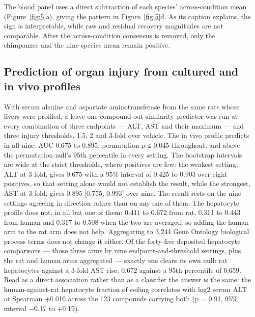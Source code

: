 \documentclass[11pt,a4paper]{article}
\begin{document}
The blood panel uses a direct subtraction of each species'
across-condition mean (Figure~\ref{fig:5}a), giving the pattern in Figure~\ref{fig:5}d. As
its caption explains, the sign is interpretable, while raw and residual
recovery magnitudes are not comparable. After the across-condition
consensus is removed, only the chimpanzee and the nine-species mean
remain positive.

\subsection{Prediction of organ injury from cultured and in vivo
profiles}\label{prediction-of-organ-injury-from-cultured-and-in-vivo-profiles}

With serum alanine and aspartate aminotransferase from the same rats
whose livers were profiled, a leave-one-compound-out similarity
predictor was run at every combination of three endpoints --- ALT, AST
and their maximum --- and three injury thresholds, 1.5, 2 and 3-fold
over vehicle. The in vivo profile predicts in all nine: AUC 0.675 to
0.895, permutation p ≤ 0.045 throughout, and above the permutation
null's 95th percentile in every setting. The bootstrap intervals are
wide at the strict thresholds, where positives are few: the weakest
setting, ALT at 3-fold, gives 0.675 with a 95\% interval of 0.425 to
0.903 over eight positives, so that setting alone would not establish
the result, while the strongest, AST at 3-fold, gives 0.895 {[}0.755,
0.993{]} over nine. The result rests on the nine settings agreeing in
direction rather than on any one of them. The hepatocyte profile does
not, in all but one of them: 0.411 to 0.672 from rat, 0.311 to 0.443
from human and 0.317 to 0.508 when the two are averaged, so adding the
human arm to the rat arm does not help. Aggregating to 3,244 Gene
Ontology biological process terms does not change it either. Of the
forty-five deposited hepatocyte comparisons --- those three arms by nine
endpoint-and-threshold settings, plus the rat and human arms aggregated
--- exactly one clears its own null: rat hepatocytes against a 3-fold
AST rise, 0.672 against a 95th percentile of 0.659. Read as a direct
association rather than as a classifier the answer is the same: the
human-against-rat hepatocyte fraction of ceiling correlates with log2
serum ALT at Spearman +0.010 across the 123 compounds carrying both (p =
0.91, 95\% interval −0.17 to +0.19).
\end{document}

